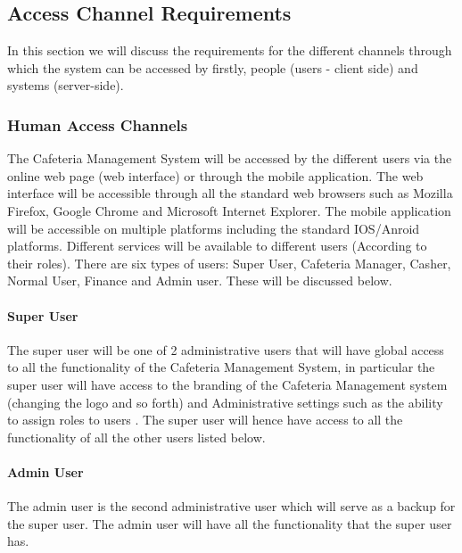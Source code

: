 \documentclass[a4paper,12pt]{article}
\begin{document}
\subsection{Access Channel Requirements}
In this section we will discuss the requirements for the different channels through which the system can be accessed by firstly, people (users - client side) and systems (server-side).


\subsubsection{Human Access Channels}
The Cafeteria Management System will be accessed by the different users via the online web page (web interface) or through the mobile application. The web interface will be accessible through all the standard web browsers such as Mozilla Firefox, Google Chrome and Microsoft Internet Explorer. The mobile application will be accessible on multiple platforms including the standard IOS/Anroid platforms. Different services will be available to different users (According to their roles). There are six types of users: Super User, Cafeteria Manager, Casher, Normal User, Finance and Admin user. These will be discussed below. \\

\paragraph{Super User\\}
The super user will be one of 2 administrative users that will have global access to all the functionality of the Cafeteria Management System, in particular the super user will have access to the branding of the Cafeteria Management system (changing the logo and so forth) and Administrative settings such as the ability to assign roles to users  . The super user will hence have access to all the functionality of all the other users listed below.

\paragraph{Admin User\\}
The admin user is the second administrative user which will serve as a backup for the super user. The admin user will have all the functionality that the super user has. 
\end{document}
